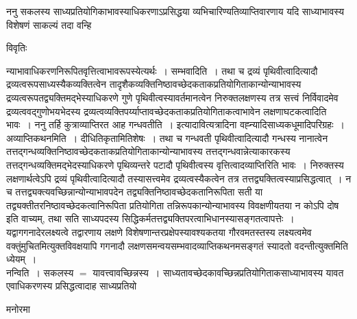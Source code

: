 \documentclass[10pt, openany]{book}
\begin{document}
{{ननु सकलस्य साध्यप्रतियोगिकाभावस्याधिकरणाऽप्रसिद्धया व्यभिचारिण्यतिव्याप्तिवारणाय यदि साध्याभावस्य विशेषणं साकल्यं तदा वन्हि}
\begin{center}     विवृतिः \end{center}
न्याभावाधिकरणनिरूपितवृत्तित्वाभावरूपस्येत्यर्थः~। सम्भवादिति~। तथा च द्रव्यं पृथिवीत्वादित्यादौ द्रव्यत्वरूपसाध्यस्यैकव्यक्तित्वेन तादृशैकव्यक्तिनिष्ठावच्छेदकताकप्रतियोगिताकान्योन्याभावस्य द्रव्यत्वरूपतद्व्यक्तिमद्भेस्याधिकरणे गुणे पृथिवीत्वस्यावर्तमानत्वेन निरुक्तलक्षणस्य तत्र सत्त्वं निर्विवादमेव
द्रव्यत्ववद्गुणोभयभेदस्य द्रव्यत्वव्यक्तिपर्य्याप्तावच्छेदकताकप्रतियोगिताकत्वाभावेन लक्षणाघटकत्वादिति भावः~। ननु तर्हि कुत्राव्याप्तिरत आह गन्धवतीति~।
इत्यादावित्यत्रादिना वह्न्यादिसाध्यकधूमादिपरिग्रहः~। अव्याप्तिकथनमिति~। दीधितिकृतामितिशेषः~। तथा च गन्धवती पृथिवीत्वादित्यादौ गन्धस्य नानात्वेन तत्तद्गन्धव्यक्तिनिष्ठावच्छेदकताकप्रतियोगिताकान्योन्याभावस्य तत्तद्गन्धवान्नेत्याकारकस्य तत्तद्गन्धव्यक्तिमद्भेदस्याधिकरणे पृथिव्यन्तरे पटादौ पृथिवीत्वस्य वृत्तित्वादव्याप्तिरिति भावः~। निरुक्तस्य लक्षणार्थत्वेऽपि द्रव्यं पृथिवीत्वादित्यादौ तस्यासत्त्वमेव द्रव्यत्वस्यैकत्वेन तत्र तत्तद्व्यक्तित्वस्याप्रसिद्धत्वात्~। न च तत्तद्व्यक्त्यवच्छिन्नान्योन्याभावपदेन
तद्व्यक्तिनिष्ठावच्छेदकतानिरूपिता सती या तद्व्यक्तीतरनिष्ठावच्छेदकत्वानिरूपिता प्रतियोगिता तन्निरूपकान्योन्याभावस्य विवक्षणीयतया न कोऽपि दोष इति वाच्यम्, तथा सति साध्यपदस्य सिद्धिकर्मतत्तद्व्यक्तिपरत्वाभिधानस्यासङ्गतत्वापत्तेः~। यद्वागगनादेरलक्ष्यत्वे तद्वारणाय लक्षणे विशेषणान्तरप्रक्षेपस्यावश्यकतया गौरवमतस्तस्य लक्ष्यत्वमेव
वक्तुंमुचितमित्युक्तविवक्षयापि गगनादौ लक्षणसमन्वयसम्भवादव्याप्तिकथनमसङ्गतं स्यादतो वदन्तीत्युक्तमिति ध्येयम्~।\\

{\la नन्विति~।} सकलस्य $=$ यावत्त्वावच्छिन्नस्य~। साध्यतावच्छेदकावच्छिन्नप्रतियोगिताकसाध्याभावस्य यावत एवाधिकरणस्य प्रसिद्धत्वादाह साध्यप्रतियो
\begin{center}   मनोरमा  \end{center}

}
\end{document}

